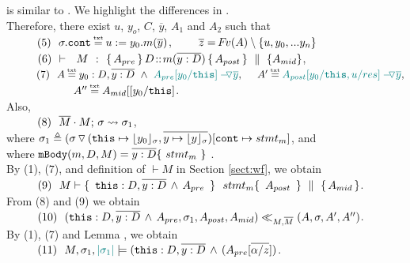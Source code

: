{\begin{description}
\item[{}] is similar to {}. 
We highlight the differences in .
\\
Therefore, there exist $u$, $y_o$, $C$, $\overline y$,  $A_1$ and $A_2$ such that \\
 $\SPS (5) \ \ \sigma.\prg{cont}\txteq u:=y_0.m(\overline y)$,  \ \ \ \ $\overline z = {\hspace{-1pt}F\hspace{-1pt}}v(A)\setminus \{ u, y_0, ... y_n \}$
\\ 
$\strut \ \ \hspace{0.5cm} \ \  (6) \  \ {\vdash \ \ M\ \ \mathbf{:}\ \  \{\, A_{pre}\, \}\, D\!::\!m(\overline{y:D})\, \{\, A_{post}\, \} \, \,\parallel\,\, \{ A_{mid} \}}$, \\
$\SPS (7) \  \ A \txteq y_0:D ,\overline {y:D}\ \wedge \  \sdN{\PushAS {y} {A_{pre}[y_0/\prg{this}]}},\ \  \ \ 
A'  \txteq  \sdN{\PushAS {y} {A_{post}[y_0/\prg{this},u/res]}},$\\
$\strut \hspace{2cm}  \  A'' \txteq  A_{mid}[[y_0/\prg{this}]$. 
\\
Also, \\
$\strut \ \ \hspace{0.5cm} \ \  (8) \ \ \overline{M}\cdot M;\, {\sigma} \rightsquigarrow \sigma_1$, \\
 where $\sigma_1\triangleq ( \sigma \, {\triangledown}\,  (\mbox{\normalfont{\texttt{this}}}\mapsto {\lfloor y_0 \rfloor_{\sigma}},{\overline{y \mapsto {\lfloor y \rfloor_{\sigma}}}}) [\mbox{\normalfont{\texttt{cont}}}\mapsto stmt_m]$, and
 \\  where 
  $\prg{mBody}(m,D,M)=\overline{y:D}\{\    stmt_m\ \}$ .\\
By (1), (7), and definition of $\vdash M$ in Section \ref{sect:wf}, we obtain\\
$\SPS (9) \ \ M \vdash  \quadruple { \ \prg{this}:D,\overline{y:D}\, \wedge\, A_{pre}\  } {\ stmt_m } {\ A_{post}\ } {A_{mid}}$.\\
From (8) and (9) we obtain  \\
$\strut \ \ \hspace{0.5cm} \ \  (10) \ \ (\mbox{\normalfont{\texttt{this}}}:D,\overline{y:D}\, \wedge\, A_{pre},\sigma_1,A_{post}, A_{mid}) \ll_{M,\overline{M}} (A,\sigma,A', A'')$. 
\\
By (1), (7) and Lemma   , we obtain\\
$\strut \ \ \hspace{0.5cm} \ \  (11) \ \  M,\sigma_1 ,{{\color{teal}{|\sigma_1|}}} \models {(\mbox{\normalfont{\texttt{this}}}:D,\overline{y:D}\, \wedge\, (A_{pre}[\overline{\alpha/z}])} $.


\end{description}}
